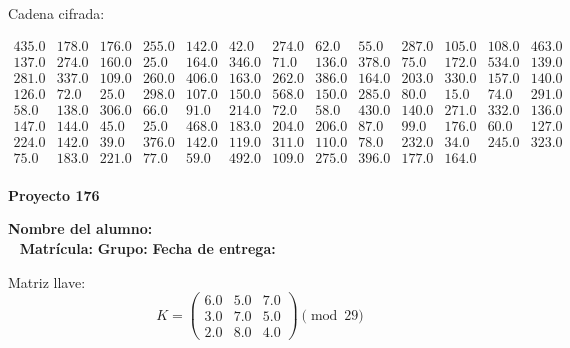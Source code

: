 \documentclass[12pt]{article}
\begin{document}
Cadena cifrada:
\begin{center}
$\begin{array}{lllllllllllll}
435.0 & 178.0 & 176.0 & 255.0 & 142.0 & 42.0 & 274.0 & 62.0 & 55.0 & 287.0 & 105.0 & 108.0 & 463.0\\
137.0 & 274.0 & 160.0 & 25.0 & 164.0 & 346.0 & 71.0 & 136.0 & 378.0 & 75.0 & 172.0 & 534.0 & 139.0\\
281.0 & 337.0 & 109.0 & 260.0 & 406.0 & 163.0 & 262.0 & 386.0 & 164.0 & 203.0 & 330.0 & 157.0 & 140.0\\
126.0 & 72.0 & 25.0 & 298.0 & 107.0 & 150.0 & 568.0 & 150.0 & 285.0 & 80.0 & 15.0 & 74.0 & 291.0\\
58.0 & 138.0 & 306.0 & 66.0 & 91.0 & 214.0 & 72.0 & 58.0 & 430.0 & 140.0 & 271.0 & 332.0 & 136.0\\
147.0 & 144.0 & 45.0 & 25.0 & 468.0 & 183.0 & 204.0 & 206.0 & 87.0 & 99.0 & 176.0 & 60.0 & 127.0\\
224.0 & 142.0 & 39.0 & 376.0 & 142.0 & 119.0 & 311.0 & 110.0 & 78.0 & 232.0 & 34.0 & 245.0 & 323.0\\
75.0 & 183.0 & 221.0 & 77.0 & 59.0 & 492.0 & 109.0 & 275.0 & 396.0 & 177.0 & 164.0\\
\end{array}$
\end{center}

\newpage


\textbf{Proyecto 176}

\textbf{Nombre del alumno:} \underline{\hspace{13cm}}\\\
\vspace{1cm}
\textbf{Matrícula:} \underline{\hspace{4cm}} \hspace{1cm}
\textbf{Grupo:} \underline{\hspace{2cm}}
\textbf{Fecha de entrega:} \underline{\hspace{2cm}}

\medskip

Matriz llave:
\[
K = \begin{pmatrix}
6.0 & 5.0 & 7.0\\
3.0 & 7.0 & 5.0\\
2.0 & 8.0 & 4.0
\end{pmatrix} \pmod{29}
\]
\end{document}
